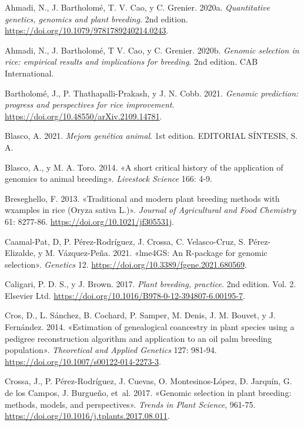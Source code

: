 \documentclass[11pt,spanish,a4paper,oneside,]{book} %
\begin{document}
\hypertarget{refs}{}
\leavevmode\hypertarget{ref-cite:33}{}%
Ahmadi, N., J. Bartholomé, T. V. Cao, y C. Grenier. 2020a. \emph{Quantitative genetics, genomics and plant breeding}. 2nd edition. \url{https://doi.org/10.1079/9781789240214.0243}.

\leavevmode\hypertarget{ref-cite:45}{}%
Ahmadi, N., J. Bartholomé, T V. Cao, y C. Grenier. 2020b. \emph{Genomic selection in rice: empirical results and implications for breeding}. 2nd edition. CAB International.

\leavevmode\hypertarget{ref-cite:58}{}%
Bartholomé, J., P. Thathapalli-Prakash, y J. N. Cobb. 2021. \emph{Genomic prediction: progress and perspectives for rice improvement}. \url{https://doi.org/10.48550/arXiv.2109.14781}.

\leavevmode\hypertarget{ref-cite:21}{}%
Blasco, A. 2021. \emph{Mejora genética animal}. 1st edition. EDITORIAL SÍNTESIS, S. A.

\leavevmode\hypertarget{ref-cite:3}{}%
Blasco, A., y M. A. Toro. 2014. «A short critical history of the application of genomics to animal breeding». \emph{Livestock Science} 166: 4-9.

\leavevmode\hypertarget{ref-cite:57}{}%
Breseghello, F. 2013. «Traditional and modern plant breeding methods with wxamples in rice (Oryza sativa L.)». \emph{Journal of Agricultural and Food Chemistry} 61: 8277-86. \url{https://doi.org/10.1021/jf305531j}.

\leavevmode\hypertarget{ref-cite:51}{}%
Caamal-Pat, D, P. Pérez-Rodríguez, J. Crossa, C. Velasco-Cruz, S. Pérez-Elizalde, y M. Vázquez-Peña. 2021. «lme4GS: An R-package for genomic selection». \emph{Genetics} 12. \url{https://doi.org/10.3389/fgene.2021.680569}.

\leavevmode\hypertarget{ref-cite:42}{}%
Caligari, P. D. S., y J. Brown. 2017. \emph{Plant breeding, practice}. 2nd edition. Vol. 2. Elsevier Ltd. \url{https://doi.org/10.1016/B978-0-12-394807-6.00195-7}.

\leavevmode\hypertarget{ref-cite:48}{}%
Cros, D., L. Sánchez, B. Cochard, P. Samper, M. Denis, J. M. Bouvet, y J. Fernández. 2014. «Estimation of genealogical coancestry in plant species using a pedigree reconstruction algorithm and application to an oil palm breeding population». \emph{Theoretical and Applied Genetics} 127: 981-94. \url{https://doi.org/10.1007/s00122-014-2273-3}.

\leavevmode\hypertarget{ref-cite:37}{}%
Crossa, J., P. Pérez-Rodríguez, J. Cuevas, O. Montesinos-López, D. Jarquín, G. de los Campos, J. Burgueño, et~al. 2017. «Genomic selection in plant breeding: methods, models, and perspectives». \emph{Trends in Plant Science}, 961-75. \url{https://doi.org/10.1016/j.tplants.2017.08.011}.
\end{document}
